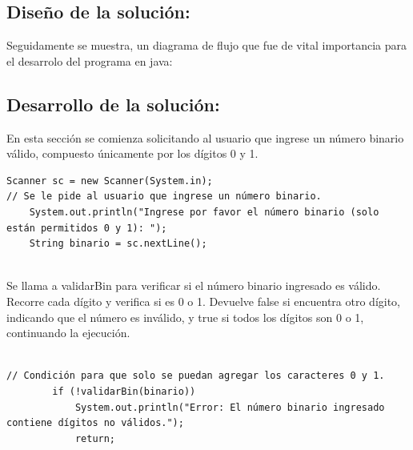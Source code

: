 \subsection{\textbf{Diseño de la solución:}}
Seguidamente se muestra, un diagrama de flujo que fue de vital importancia para el desarrolo del programa en java:
\subsection{\textbf{Desarrollo de la solución:}}
En esta sección se comienza solicitando al usuario que ingrese un número binario válido, compuesto únicamente por los dígitos 0 y 1.

\begin{lstlisting}[style=javaStyle]
        Scanner sc = new Scanner(System.in);
// Se le pide al usuario que ingrese un número binario.
    System.out.println("Ingrese por favor el número binario (solo están permitidos 0 y 1): ");
    String binario = sc.nextLine();
  
\end{lstlisting}
Se llama a validarBin para verificar si el número binario ingresado es válido. Recorre cada dígito y verifica si es 0 o 1. Devuelve false si encuentra otro dígito, indicando que el número es inválido, y true si todos los dígitos son 0 o 1, continuando la ejecución.
\begin{lstlisting}[style=javaStyle] 
    
// Condición para que solo se puedan agregar los caracteres 0 y 1.
        if (!validarBin(binario)) 
            System.out.println("Error: El número binario ingresado contiene dígitos no válidos.");
            return;
     
\end{lstlisting}

